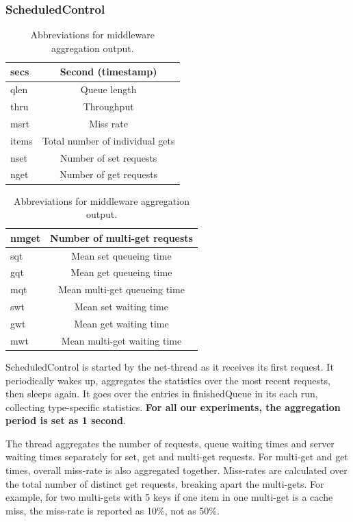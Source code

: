 \documentclass[11pt,a4paper]{article}
\begin{document}
\subsubsection{ScheduledControl} \label{sec:ov-scheduledcontrol}
\begin{table}[h!]
\small
\begin{minipage}{.5\textwidth}
	\centering
	\begin{tabular}{|l|c|}
		\hline secs & Second (timestamp) \\
		\hline qlen & Queue length \\
		\hline thru & Throughput \\
		\hline msrt & Miss rate \\
		\hline items & Total number of individual gets \\
		\hline nset & Number of set requests \\
		\hline nget & Number of get requests \\
		\hline 
	\end{tabular}
\end{minipage}%
\begin{minipage}{.5\textwidth}
	\centering
	\begin{tabular}{|l|c|}
		\hline nmget & Number of multi-get requests \\
		\hline sqt & Mean set queueing time \\
		\hline gqt & Mean get queueing time \\
		\hline mqt & Mean multi-get queueing time \\
		\hline swt & Mean set waiting time \\
		\hline gwt & Mean get waiting time \\
		\hline mwt & Mean multi-get waiting time \\
		\hline 
	\end{tabular}
\end{minipage}
\caption{Abbreviations for middleware aggregation output.} \label{tab:aggr-abbrs}
\end{table}
ScheduledControl is started by the net-thread as it receives its first request. It periodically wakes up, aggregates the statistics over the most recent requests, then sleeps again. It goes over the entries in finishedQueue in its each run, collecting type-specific statistics. \textbf{For all our experiments, the aggregation period is set as 1 second}.
\par The thread aggregates the number of requests, queue waiting times and server waiting times separately for set, get and multi-get requests. For multi-get and get times, overall miss-rate is also aggregated together. Miss-rates are calculated over the total number of distinct get requests, breaking apart the multi-gets. For example, for two multi-gets with 5 keys if one item in one multi-get is a cache miss, the miss-rate is reported as 10\%, not as 50\%.
\end{document}
